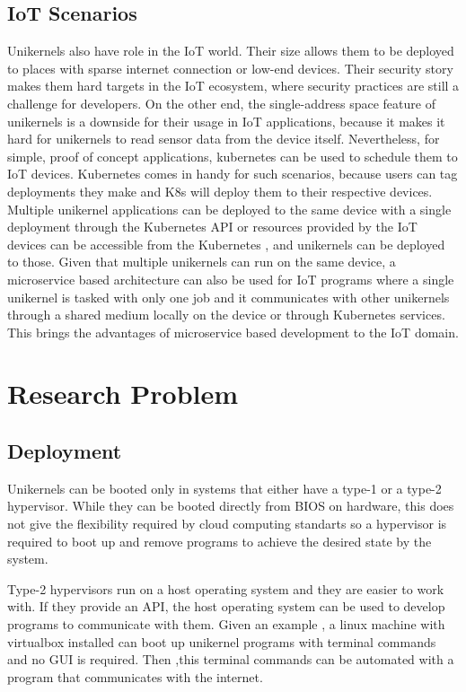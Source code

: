 \subsection{IoT Scenarios}
Unikernels also have role in the IoT world. Their size allows them to be deployed to places with sparse internet connection or low-end devices. Their security story makes them hard targets in the IoT ecosystem, where security practices are still a challenge for developers. \cite{iot-sec} On the other end, the single-address space feature of unikernels is a downside for their usage in IoT applications, because it makes it hard for unikernels to read sensor data from the device itself. Nevertheless, for simple, proof of concept applications, kubernetes can be used to schedule them to IoT devices. Kubernetes comes in handy for such scenarios, because users can tag deployments they make and K8s will deploy them to their respective devices. Multiple unikernel applications can be deployed to the same device with a single deployment through the Kubernetes API or resources provided by the IoT devices can be accessible from the Kubernetes , and unikernels can be deployed to those. Given that multiple unikernels can run on the same device, a microservice based architecture can also be used for IoT programs where a single unikernel is tasked with only one job and it communicates with other unikernels through a shared medium locally on the device or through Kubernetes services. This brings the advantages of microservice based development to the IoT domain.


\section{Research Problem}
\subsection{Deployment}
Unikernels can be booted only in systems that either have a type-1 or a type-2 hypervisor. While they can be booted directly from BIOS on hardware, this does not give the flexibility required by cloud computing standarts so a hypervisor is required to boot up and remove programs to achieve the desired state by the system.

Type-2 hypervisors run on a host operating system and they are easier to work with. If they provide an API, the host operating system can be used to develop programs to communicate with them. Given an example , a linux machine with virtualbox installed can boot up unikernel programs with terminal commands and no GUI is required. Then ,this terminal commands can be automated with a program that communicates with the internet.

